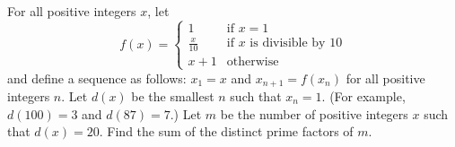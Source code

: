 For all positive integers $ x$, let
\[ f(x) = \begin{cases}1 & \text{if }x = 1 \\
\frac x{10} & \text{if }x\text{ is divisible by 10} \\
x + 1 & \text{otherwise}\end{cases}\]and define a sequence as follows: $ x_1 = x$ and $ x_{n + 1} = f(x_n)$ for all positive integers $ n$. Let $ d(x)$ be the smallest $ n$ such that $ x_n = 1$. (For example, $ d(100) = 3$ and $ d(87) = 7$.) Let $ m$ be the number of positive integers $ x$ such that $ d(x) = 20$. Find the sum of the distinct prime factors of $ m$.